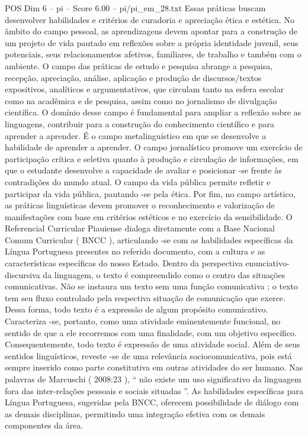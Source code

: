 \begin{textsample}{POS Dim 6 – pi – Score 6.00 – pi/pi\_em\_28.txt}
Essas práticas buscam desenvolver habilidades e critérios de curadoria e apreciação ética e estética.
No âmbito do campo pessoal, as aprendizagens devem apontar para a construção de um projeto de vida pautado em reflexões sobre a própria identidade juvenil, seus potenciais, seus relacionamentos afetivos, familiares, de trabalho e também com o ambiente.
O campo das práticas de estudo e pesquisa abrange a pesquisa, recepção, apreciação, análise, aplicação e produção de discursos/textos expositivos, analíticos e argumentativos, que circulam tanto na esfera escolar como na acadêmica e de pesquisa, assim como no jornalismo de divulgação científica.
O domínio desse campo é fundamental para ampliar a reflexão sobre as linguagens, contribuir para a construção do conhecimento científico e para aprender a aprender.
É o campo metalinguístico em que se desenvolve a habilidade de aprender a aprender.
O campo jornalístico promove um exercício de participação crítica e seletiva quanto à produção e circulação de informações, em que o estudante desenvolve a capacidade de avaliar e posicionar -se frente às contradições do mundo atual.
O campo da vida pública permite refletir e participar da vida pública, pautando -se pela ética.
Por fim, no campo artístico, as práticas linguísticas devem promover o reconhecimento e valorização de manifestações com base em critérios estéticos e no exercício da sensibilidade.
O Referencial Curricular Piauiense dialoga diretamente com a Base Nacional Comum Curricular ( BNCC ), articulando -se com as habilidades específicas da Língua Portuguesa presentes no referido documento, com a cultura e as características específicas do nosso Estado.
Dentro da perspectiva enunciativo-discursiva da linguagem, o texto é compreendido como o centro das situações comunicativas.
Não se instaura um texto sem uma função comunicativa ; o texto tem seu fluxo controlado pela respectiva situação de comunicação que exerce.
Dessa forma, todo texto é a expressão de algum propósito comunicativo.
Caracteriza -se, portanto, como uma atividade eminentemente funcional, no sentido de que a ele recorremos com uma finalidade, com um objetivo específico.
Consequentemente, todo texto é expressão de uma atividade social.
Além de seus sentidos linguísticos, reveste -se de uma relevância sociocomunicativa, pois está sempre inserido como parte constitutiva em outras atividades do ser humano.
Nas palavras de Marcuschi ( 2008:23 ), “ não existe um uso significativo da linguagem fora das inter-relações pessoais e sociais situadas ”.
As habilidades específicas para Língua Portuguesa, sugeridas pela BNCC, oferecem possibilidade de diálogo com as demais disciplinas, permitindo uma integração efetiva com os demais componentes da área.

\end{textsample}
